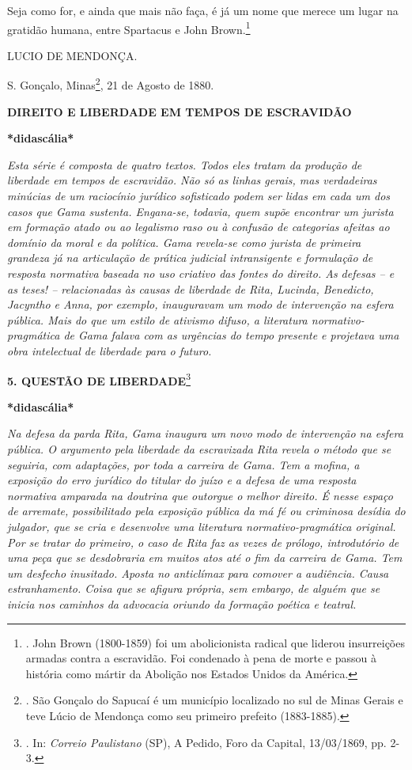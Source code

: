 Seja como for, e ainda que mais não faça, é já um nome que merece um
lugar na gratidão humana, entre Spartacus e John Brown.\footnote{. John
  Brown (1800-1859) foi um abolicionista radical que liderou
  insurreições armadas contra a escravidão. Foi condenado à pena de
  morte e passou à história como mártir da Abolição nos Estados Unidos
  da América.}

LUCIO DE MENDONÇA.

S. Gonçalo, Minas\footnote{. São Gonçalo do Sapucaí é um município
  localizado no sul de Minas Gerais e teve Lúcio de Mendonça como seu
  primeiro prefeito (1883-1885).}, 21 de Agosto de 1880.

\textbf{DIREITO E LIBERDADE EM TEMPOS DE ESCRAVIDÃO}

\textbf{*didascália*}

\emph{Esta série é composta de quatro textos. Todos eles tratam da
produção de liberdade em tempos de escravidão. Não só as linhas gerais,
mas verdadeiras minúcias de um raciocínio jurídico sofisticado podem ser
lidas em cada um dos casos que Gama sustenta. Engana-se, todavia, quem
supõe encontrar um jurista em formação atado ou ao legalismo raso ou à
confusão de categorias afeitas ao domínio da moral e da política. Gama
revela-se como jurista de primeira grandeza já na articulação de prática
judicial intransigente e formulação de resposta normativa baseada no uso
criativo das fontes do direito. As defesas -- e as teses! --
relacionadas às causas de liberdade de Rita, Lucinda, Benedicto,
Jacyntho e Anna, por exemplo, inauguravam um modo de intervenção na
esfera pública. Mais do que um estilo de ativismo difuso, a literatura
normativo-pragmática de Gama falava com as urgências do tempo presente e
projetava uma obra intelectual de liberdade para o futuro.}

\textbf{5. QUESTÃO DE LIBERDADE}\footnote{. In: \emph{Correio
  Paulistano} (SP), A Pedido, Foro da Capital, 13/03/1869, pp. 2-3.}

\textbf{*didascália*}

\emph{Na defesa da parda Rita, Gama inaugura um novo modo de intervenção
na esfera pública. O argumento pela liberdade da escravizada Rita revela
o método que se seguiria, com adaptações, por toda a carreira de Gama.
Tem a mofina, a exposição do erro jurídico do titular do juízo e a
defesa de uma resposta normativa amparada na doutrina que outorgue o
melhor direito. É nesse espaço de arremate, possibilitado pela exposição
pública da má fé ou criminosa desídia do julgador, que se cria e
desenvolve uma literatura normativo-pragmática original. Por se tratar
do primeiro, o caso de Rita faz as vezes de prólogo, introdutório de uma
peça que se desdobraria em muitos atos até o fim da carreira de Gama.
Tem um desfecho inusitado. Aposta no anticlímax para comover a
audiência. Causa estranhamento. Coisa que se afigura própria, sem
embargo, de alguém que se inicia nos caminhos da advocacia oriundo da
formação poética e teatral. }

